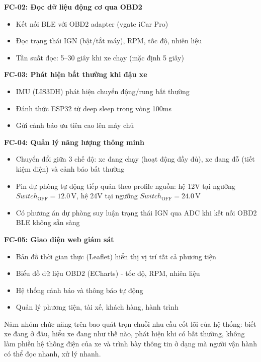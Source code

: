 \documentclass[a4paper]{extarticle}
\providecommand{\tightlist}{%
  \setlength{\itemsep}{0pt}\setlength{\parskip}{0pt}}
\begin{document}
\textbf{FC-02: Đọc dữ liệu động cơ qua OBD2}

\begin{itemize}
\tightlist
\item
  Kết nối BLE với OBD2 adapter (vgate iCar Pro)
\item
  Đọc trạng thái IGN (bật/tắt máy), RPM, tốc độ, nhiên liệu
\item
  Tần suất đọc: 5--30 giây khi xe chạy (mặc định 5 giây)
\end{itemize}

\textbf{FC-03: Phát hiện bất thường khi đậu xe}

\begin{itemize}
\tightlist
\item
  IMU (LIS3DH) phát hiện chuyển động/rung bất thường
\item
  Đánh thức ESP32 từ deep sleep trong vòng 100ms
\item
  Gửi cảnh báo ưu tiên cao lên máy chủ
\end{itemize}

\textbf{FC-04: Quản lý năng lượng thông minh}

\begin{itemize}
\tightlist
\item
  Chuyển đổi giữa 3 chế độ: xe đang chạy (hoạt động đầy đủ), xe đang đỗ
  (tiết kiệm điện) và cảnh báo bất thường
\item
  Pin dự phòng tự động tiếp quản theo profile nguồn: hệ 12V tại ngưỡng
  \(Switch_{\mathrm{OFF}} = 12.0\,\mathrm{V}\), hệ 24V tại ngưỡng
  \(Switch_{\mathrm{OFF}} = 24.0\,\mathrm{V}\)
\item
  Có phương án dự phòng suy luận trạng thái IGN qua ADC khi kết nối OBD2
  BLE không sẵn sàng
\end{itemize}

\textbf{FC-05: Giao diện web giám sát}

\begin{itemize}
\tightlist
\item
  Bản đồ thời gian thực (Leaflet) hiển thị vị trí tất cả phương tiện
\item
  Biểu đồ dữ liệu OBD2 (ECharts) - tốc độ, RPM, nhiên liệu
\item
  Hệ thống cảnh báo và thông báo tự động
\item
  Quản lý phương tiện, tài xế, khách hàng, hành trình
\end{itemize}

Năm nhóm chức năng trên bao quát trọn chuỗi nhu cầu cốt lõi của hệ
thống: biết xe đang ở đâu, hiểu xe đang như thế nào, phát hiện khi có
bất thường, không làm phiền hệ thống điện của xe và trình bày thông tin ở
dạng mà người vận hành có thể đọc nhanh, xử lý nhanh.
\end{document}
